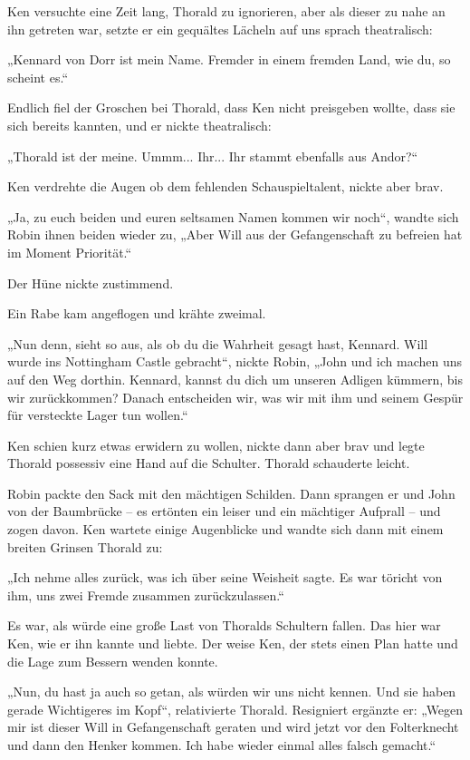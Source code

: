 Ken versuchte eine Zeit lang, Thorald zu ignorieren, aber als dieser zu nahe an ihn getreten war, setzte er ein gequältes Lächeln auf uns sprach theatralisch:

„Kennard von Dorr ist mein Name. Fremder in einem fremden Land, wie du, so scheint es.“

Endlich fiel der Groschen bei Thorald, dass Ken nicht preisgeben wollte, dass sie sich bereits kannten, und er nickte theatralisch:

„Thorald ist der meine. Ummm... Ihr... Ihr stammt ebenfalls aus Andor?“

Ken verdrehte die Augen ob dem fehlenden Schauspieltalent, nickte aber brav.

„Ja, zu euch beiden und euren seltsamen Namen kommen wir noch“, wandte sich Robin ihnen beiden wieder zu, „Aber Will aus der Gefangenschaft zu befreien hat im Moment Priorität.“

Der Hüne nickte zustimmend.

Ein Rabe kam angeflogen und krähte zweimal.

„Nun denn, sieht so aus, als ob du die Wahrheit gesagt hast, Kennard. Will wurde ins Nottingham Castle gebracht“, nickte Robin, „John und ich machen uns auf den Weg dorthin. Kennard, kannst du dich um unseren Adligen kümmern, bis wir zurückkommen? Danach entscheiden wir, was wir mit ihm und seinem Gespür für versteckte Lager tun wollen.“

Ken schien kurz etwas erwidern zu wollen, nickte dann aber brav und legte Thorald possessiv eine Hand auf die Schulter. Thorald schauderte leicht.

Robin packte den Sack mit den mächtigen Schilden. Dann sprangen er und John von der Baumbrücke – es ertönten ein leiser und ein mächtiger Aufprall – und zogen davon. Ken wartete einige Augenblicke und wandte sich dann mit einem breiten Grinsen Thorald zu:

„Ich nehme alles zurück, was ich über seine Weisheit sagte. Es war töricht von ihm, uns zwei Fremde zusammen zurückzulassen.“

Es war, als würde eine große Last von Thoralds Schultern fallen. Das hier war Ken, wie er ihn kannte und liebte. Der weise Ken, der stets einen Plan hatte und die Lage zum Bessern wenden konnte.

„Nun, du hast ja auch so getan, als würden wir uns nicht kennen. Und sie haben gerade Wichtigeres im Kopf“, relativierte Thorald. Resigniert ergänzte er: „Wegen mir ist dieser Will in Gefangenschaft geraten und wird jetzt vor den Folterknecht und dann den Henker kommen. Ich habe wieder einmal alles falsch gemacht.“

